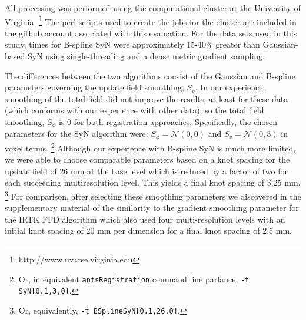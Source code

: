 \documentclass{frontiersSCNS}
\begin{document}
All processing was performed using the computational cluster at the 
University of Virginia.%
\footnote{
http://www.uvacse.virginia.edu
}
The perl scripts used to create the jobs for the cluster are
included in the github account associated with this evaluation.  
For the
data sets used in this study, times for B-spline SyN were approximately 
15-40\% greater than Gaussian-based SyN using single-threading and a dense
metric gradient sampling.

The differences between the two algorithms consist of the Gaussian and 
B-spline parameters governing the update field smoothing, $S_v$.  In our 
experience, smoothing of the total field did not improve the results, at
least for these data (which conforms with our experience with other
data), so the total field smoothing, $S_{\phi}$ is 0 for
both registration approaches.  Specifically, the chosen parameters
for the SyN algorithm were:  $S_{\phi} = \mathcal{N}(0,0)$ and 
$S_{v} = \mathcal{N}(0,3)$ in voxel terms.%
\footnote{
 Or, in equivalent {\tt antsRegistration} command line parlance, {\tt -t
 SyN[0.1,3,0]}.
 }  Although our experience with B-spline SyN is much more limited, we 
were able to choose comparable parameters based on a knot spacing
for the update field of 26 mm at the base level which is reduced by
a factor of two for each succeeding multiresolution level.  This 
yields a final knot spacing of 3.25 mm.%
\footnote{
 Or, equivalently, {\tt -t
 BSplineSyN[0.1,26,0]}.
 }
For comparison, after selecting these smoothing parameters we discovered 
in the supplementary material of \cite{klein2009} the similarity to the 
gradient smoothing parameter for the IRTK FFD algorithm
which also used four multi-resolution levels with an initial knot spacing of
20 mm per dimension for a final knot spacing of 2.5 mm.  
\end{document}
